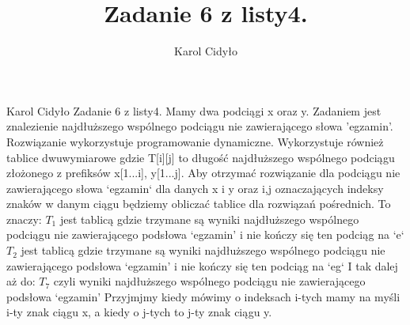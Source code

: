 \documentclass[a4paper,10pt]{article}
\author{Karol Cidyło}
\title {Zadanie 6 z listy4.}
\begin{document}
Karol Cidyło \newline \newline \newline
Zadanie 6 z listy4. \newline \newline
Mamy dwa podciągi x oraz y. Zadaniem jest znalezienie najdłuższego wspólnego podciągu nie zawierającego słowa 'egzamin'.
Rozwiązanie wykorzystuje programowanie dynamiczne. Wykorzystuje również tablice dwuwymiarowe gdzie T[i][j] to długość najdłuższego wspólnego podciągu
złożonego z prefiksów x[1...i], y[1...j]. 
Aby otrzymać rozwiązanie dla podciągu nie zawierającego słowa `egzamin` dla danych x i y oraz i,j oznaczających indeksy znaków w danym ciągu 
będziemy obliczać tablice dla rozwiązań pośrednich.  To znaczy: \newline
${T_1}$ jest tablicą gdzie trzymane są wyniki najdłuższego wspólnego podciągu nie zawierającego podsłowa `egzamin' i nie kończy się ten podciąg na `e` \newline
${T_2}$ jest tablicą gdzie trzymane są wyniki najdłuższego wspólnego podciągu nie zawierającego podsłowa `egzamin' i nie kończy się ten podciąg na `eg`\newline
I tak dalej aż do:
${T_7}$ czyli wyniki najdłuższego wspólnego podciągu nie zawierającego podsłowa `egzamin' \newline
Przyjmjmy kiedy mówimy o indeksach i-tych mamy na myśli i-ty znak ciągu x, a kiedy o j-tych to j-ty znak ciągu y. \newline
\end{document}
